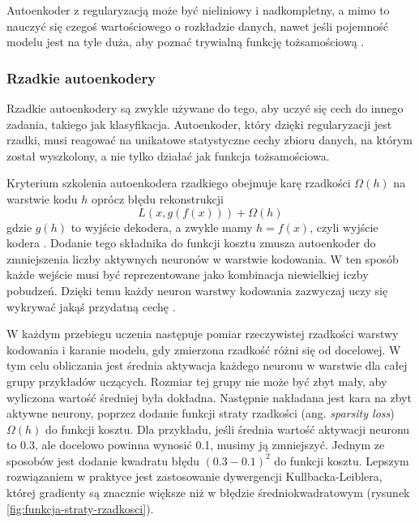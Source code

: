 \documentclass[12pt]{mwbk}
\theoremstyle{plain}
\theoremstyle{definition}
\theoremstyle{remark}
\begin{document}
Autoenkoder z regularyzacją może być nieliniowy i nadkompletny, a mimo to nauczyć się czegoś wartościowego o rozkładzie danych, nawet jeśli pojemność modelu jest na tyle duża, aby poznać trywialną funkcję tożsamościową \cite{goodfellow}.

\subsubsection{Rzadkie autoenkodery}

Rzadkie autoenkodery są zwykle używane do tego, aby uczyć się cech do innego zadania, takiego jak klasyfikacja. Autoenkoder, który dzięki regularyzacji jest rzadki, musi reagować na unikatowe statystyczne cechy zbioru danych, na którym został wyszkolony, a nie tylko działać jak funkcja tożsamościowa.

Kryterium szkolenia autoenkodera rzadkiego obejmuje karę rzadkości $\Omega(h)$ na warstwie kodu $h$ oprócz błędu rekonstrukcji
$$L(x, g(f(x)))+\Omega(h)$$
gdzie $g(h)$ to wyjście dekodera, a zwykle mamy $h=f(x)$, czyli wyjście kodera \cite{goodfellow}. Dodanie tego składnika do funkcji kosztu zmusza autoenkoder do zmniejszenia liczby aktywnych neuronów w warstwie kodowania. W ten sposób każde wejście musi być reprezentowane jako kombinacja niewielkiej iczby pobudzeń. Dzięki temu każdy neuron warstwy kodowania zazwyczaj uczy się wykrywać jakąś przydatną cechę \cite{geron}.

W każdym przebiegu uczenia następuje pomiar rzeczywistej rzadkości warstwy kodowania i karanie modelu, gdy zmierzona rzadkość różni się od docelowej. W tym celu obliczania jest średnia aktywacja każdego neuronu w warstwie dla całej grupy przykładów uczących. Rozmiar tej grupy nie może być zbyt mały, aby wyliczona wartość średniej była dokładna. Następnie nakładana jest kara na zbyt aktywne neurony, poprzez dodanie funkcji straty rzadkości (ang. \emph{sparsity loss}) $\Omega(h)$ do funkcji kosztu. Dla przykładu, jeśli średnia wartość aktywacji neuronu to 0.3, ale docelowo powinna wynosić 0.1, musimy ją zmniejszyć. Jednym ze sposobów jest dodanie kwadratu błędu $(0.3-0.1)^2$ do funkcji kosztu. Lepszym rozwiązaniem w praktyce jest zastosowanie dywergencji Kullbacka-Leiblera, której gradienty są znacznie większe niż w błędzie średniokwadratowym (rysunek \ref{fig:funkcja-straty-rzadkosci}).
\end{document}
